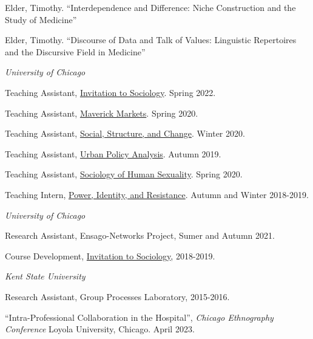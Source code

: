 \documentclass[11pt,article,oneside]{memoir}
\begin{document}
\ind Elder, Timothy. ``Interdependence and Difference: Niche Construction and the Study of Medicine'' \vspace{0.05in}

\ind Elder, Timothy. ``Discourse of Data and Talk of Values: Linguistic Repertoires and the Discursive Field in Medicine'' \vspace{0.05in}

\bigskip

\medskip
\noindent\emph{University of Chicago \vspace{0.01in}}

\ind Teaching Assistant, \underline{Invitation to Sociology}. Spring 2022.

\ind Teaching Assistant, \underline{Maverick Markets}. Spring 2020.

\ind Teaching Assistant, \underline{Social, Structure, and Change}. Winter 2020.

\ind Teaching Assistant, \underline{Urban Policy Analysis}. Autumn 2019.

\ind Teaching Assistant, \underline{Sociology of Human Sexuality}. Spring 2020.

\ind Teaching Intern, \underline{Power, Identity, and Resistance}. Autumn and Winter 2018-2019.

\bigskip

\medskip
\noindent\emph{University of Chicago \vspace{0.01in}}

\ind Research Assistant, Ensago-Networks Project, Sumer and Autumn 2021. \vspace{0.05in}

\ind Course Development, \underline{Invitation to Sociology}, 2018-2019. \vspace{0.05in}

\smallskip
\noindent\emph{Kent State University \vspace{0.01in}}

\ind Research Assistant, Group Processes Laboratory, 2015-2016. \vspace{0.1in}

\normalsize

\bigskip

\medskip

\ind ``Intra-Professional Collaboration in the Hospital'', \emph{Chicago Ethnography Conference} Loyola University, Chicago. April 2023. \vspace{0.05in}
\end{document}
